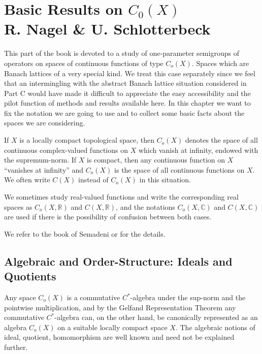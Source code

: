 
\chapter{Basic Results on $C_{0}(X)$ \\
R. Nagel \& U. Schlotterbeck}\label{chap:B-I}

This part of the book is devoted to a study of one-parameter semigroups of operators on spaces of continuous functions of type $C_{o}(X)$.
Spaces which are Banach lattices of a very special kind.
We treat this case separately since we feel that an intermingling with the abstract Banach lattice situation considered in Part C would have made it difficult to appreciate the easy accessibility and the pilot function of methods and results available here.
In this chapter we want to fix the notation we are going to use and to collect some basic facts about the spaces we are considering.

If $X$ is a locally compact topological space, then $C_{o}(X)$ denotes the space of all continuous complex-valued functions on $X$ which vanish at infinity, endowed with the supremum-norm.
If $X$ is compact, then any continuous function on $X$ \enquote{vanishes at infinity} and $C_{o}(X)$ is the space of all continuous functions on $X$.
We often write $C(X)$ instead of $C_{o}(X)$ in this situation.

We sometimes study real-valued functions and write the corresponding real spaces as $C_{o}(X,\mathbb{R})$ and $C(X,\mathbb{R})$, and the notations $C_{o}(X,\mathbb{C})$ and $C(X,\mathbb{C})$ are used if there is the possibility of confusion between both cases.

We refer to the book of Semadeni \cite{semadeni:1971} or \cite{folland:1999} for the details.

\section{Algebraic and Order-Structure: Ideals and Quotients}\label{sec:b1-1}

Any space $C_{o}(X)$ is a commutative $C^{*}$-algebra under the sup-norm and the pointwise multiplication, and by the Gelfand Representation Theorem any commutative $C^{*}$-algebra can, on the other hand, be canonically represented as an algebra $C_{o}(X)$ on a suitable locally compact space $X$.
The algebraic notions of ideal, quotient, homomorphism are
well known and need not be explained further.

